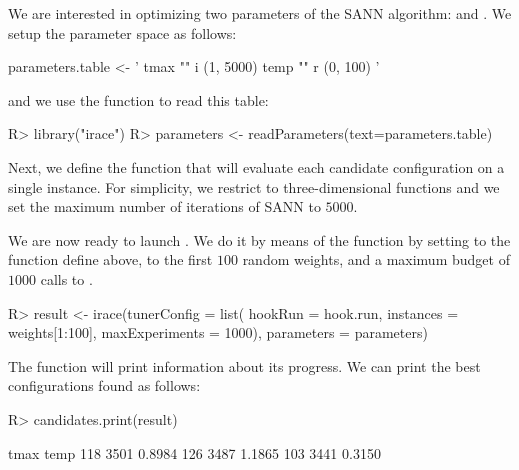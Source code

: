 \documentclass[article,a4paper,nojss,notitle]{jss}
\newcommand{\irace}{\pkg{irace}\xspace}
\begin{document}
We are interested in optimizing two parameters of the SANN algorithm:  and . We setup the parameter space as follows:

\begin{CodeInput}
parameters.table <- '
tmax "" i (1, 5000)
temp "" r (0, 100)
'
\end{CodeInput}

and we use the \irace function  to read this table:

\begin{CodeInput}
R> library("irace")
R> parameters <- readParameters(text=parameters.table)
\end{CodeInput}

Next, we define the function that will evaluate each candidate
configuration on a single instance. For simplicity, we restrict to
three-dimensional functions and we set the maximum number of
iterations of SANN to $5000$.


We are now ready to launch \irace. We do it by means of the
 function by setting  to the function define
above,  to the first $100$ random weights, and a
maximum budget of $1000$ calls to .

\begin{CodeChunk}
\begin{CodeInput}
R> result <- irace(tunerConfig = list(
                    hookRun = hook.run,
                    instances = weights[1:100],
                    maxExperiments = 1000),
                  parameters = parameters)
\end{CodeInput}
\end{CodeChunk}

The function  will print information about its progress. We can print the best configurations found as follows:

\begin{CodeChunk}
\begin{CodeInput}
R> candidates.print(result)
\end{CodeInput}
\begin{CodeOutput}
      tmax   temp
118 3501 0.8984
126 3487 1.1865
103 3441 0.3150
\end{CodeOutput}
\end{CodeChunk}
\end{document}
